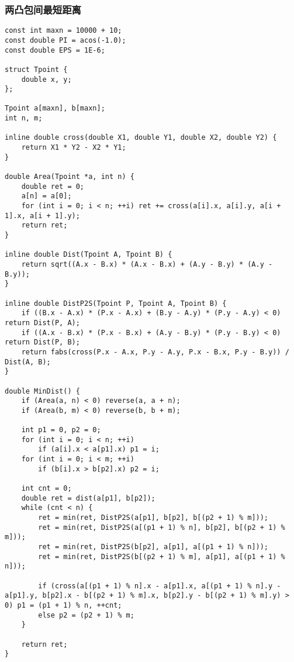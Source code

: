 \subsubsection{两凸包间最短距离}
\begin{verbatim}
const int maxn = 10000 + 10;
const double PI = acos(-1.0);
const double EPS = 1E-6;

struct Tpoint {
	double x, y;
};

Tpoint a[maxn], b[maxn];
int n, m;

inline double cross(double X1, double Y1, double X2, double Y2) {
	return X1 * Y2 - X2 * Y1;
}

double Area(Tpoint *a, int n) {
	double ret = 0;
	a[n] = a[0];
	for (int i = 0; i < n; ++i) ret += cross(a[i].x, a[i].y, a[i + 1].x, a[i + 1].y);
	return ret;
}

inline double Dist(Tpoint A, Tpoint B) {
	return sqrt((A.x - B.x) * (A.x - B.x) + (A.y - B.y) * (A.y - B.y));
}

inline double DistP2S(Tpoint P, Tpoint A, Tpoint B) {
	if ((B.x - A.x) * (P.x - A.x) + (B.y - A.y) * (P.y - A.y) < 0) return Dist(P, A);
	if ((A.x - B.x) * (P.x - B.x) + (A.y - B.y) * (P.y - B.y) < 0) return Dist(P, B);
	return fabs(cross(P.x - A.x, P.y - A.y, P.x - B.x, P.y - B.y)) / Dist(A, B);
}

double MinDist() {
	if (Area(a, n) < 0) reverse(a, a + n);
	if (Area(b, m) < 0) reverse(b, b + m);

	int p1 = 0, p2 = 0;
	for (int i = 0; i < n; ++i)
		if (a[i].x < a[p1].x) p1 = i;
	for (int i = 0; i < m; ++i)
		if (b[i].x > b[p2].x) p2 = i;

	int cnt = 0;
	double ret = dist(a[p1], b[p2]);
	while (cnt < n) {
		ret = min(ret, DistP2S(a[p1], b[p2], b[(p2 + 1) % m]));
		ret = min(ret, DistP2S(a[(p1 + 1) % n], b[p2], b[(p2 + 1) % m]));
		ret = min(ret, DistP2S(b[p2], a[p1], a[(p1 + 1) % n]));
		ret = min(ret, DistP2S(b[(p2 + 1) % m], a[p1], a[(p1 + 1) % n]));

		if (cross(a[(p1 + 1) % n].x - a[p1].x, a[(p1 + 1) % n].y - a[p1].y, b[p2].x - b[(p2 + 1) % m].x, b[p2].y - b[(p2 + 1) % m].y) > 0) p1 = (p1 + 1) % n, ++cnt;
		else p2 = (p2 + 1) % m;
	}

	return ret;
}
\end{verbatim}
